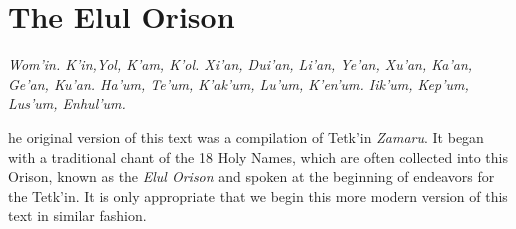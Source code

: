 \section{The Elul Orison}

\begin{center}\textit{Wom’in. K’in,Yol, K’am, K’ol. Xi’an, Dui’an, Li’an, Ye’an, Xu’an, Ka’an, Ge’an, Ku’an. Ha’um, Te’um, K’ak’um, Lu’um, K’en’um. Iik’um, Kep’um, Lus’um, Enhul’um.}\end{center} 

\bigskip


\lettrine[findent=2pt]{}{ }he original version of this text was a compilation of Tetk’in \textit{Zamaru}. It began with a traditional chant of the 18 Holy Names, which are often collected into this Orison, known as the \textit{Elul Orison} and spoken at the beginning of endeavors for the Tetk'in. It is only appropriate that we begin this more modern version of this text in similar fashion. 

